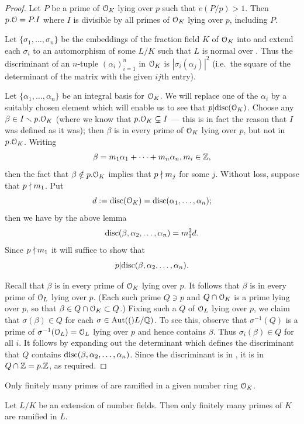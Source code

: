 \documentclass[10pt,a4paper]{amsart}
\begin{document}
\begin{proof}
Let $P$ be a prime of $\mathcal{O}_K$ lying over $p$ such that $e(P/p) > 1$. Then $p.\mathcal{O}
= P.I$ where $I$ is divisible by all primes of $\mathcal{O}_K$ lying over $p$, including
$P$.

Let $\{\sigma_1,\dots,\sigma_n\}$ be the embeddings of the fraction field $K$
of $\mathcal{O}_K$ into \C{} and extend each $\sigma_i$ to an automorphism of some $L/K$
such that $L$ is normal over \Q{}. Thus the discriminant of an $n$-tuple
$(\alpha_i)_{i=1}^n$ in $\mathcal{O}_K$ is $|\sigma_i(\alpha_j)|^2$ (i.e.~the square of
the determinant of the matrix with the given $ij$th entry).

Let $\{\alpha_1,\dots,\alpha_n\}$ be an integral basis for $\mathcal{O}_K$. We will
replace one of the $\alpha_i$ by a suitably chosen element which will enable us
to see that $p|\mathrm{disc}(\mathcal{O}_K)$. Choose any $\beta \in I\smallsetminus p.\mathcal{O}_K$
(where we know that $p.\mathcal{O}_K \subsetneq I$ --- this is in fact the reason that
$I$ was defined as it was); then $\beta$ is in every prime of $\mathcal{O}_K$ lying over
$p$, but not in $p.\mathcal{O}_K$. Writing \[\beta = m_1\alpha_1 + \cdots + m_n\alpha_n,
m_i\in \mathbb{Z},\] then the fact that $\beta\notin p.\mathcal{O}_K$ implies that $p\nmid m_j$
for some $j$. Without loss, suppose that $p\nmid m_1$. Put \[d := \mathrm{disc}(\mathcal{O}_K) =
\mathrm{disc}(\alpha_1,\dots,\alpha_n);\] then we have by the above lemma
\[\mathrm{disc}(\beta,\alpha_2,\dots,\alpha_n) = m_1^2 d.\] Since $p\nmid m_1$ it will
suffice to show that \[p | \mathrm{disc}(\beta,\alpha_2,\dots,\alpha_n).\]

Recall that $\beta$ is in every prime of $\mathcal{O}_K$ lying over $p$. It follows that
$\beta$ is in every prime of $\mathcal{O}_L$ lying over $p$. (Each such prime $Q\ni p$
and $Q\cap \mathcal{O}_K$ is a prime lying over $p$, so that $\beta\in Q\cap\mathcal{O}_K \subset
Q$.) Fixing such a $Q$ of $\mathcal{O}_L$ lying over $p$, we claim that
$\sigma(\beta)\in Q$ for each $\sigma \in \mathrm{Aut}(()L/\mathbb{Q})$. To see this, observe
that $\sigma^{-1}(Q)$ is a prime of $\sigma^{-1}(\mathcal{O}_L)=\mathcal{O}_L$ lying over $p$ and
hence contains $\beta$. Thus $\sigma_i(\beta)\in Q$ for all $i$. It follows by
expanding out the determinant which defines the discriminant that $Q$ contains
$\mathrm{disc}(\beta,\alpha_2,\dots,\alpha_n)$. Since the discriminant is in \Z{}, it
is in $Q\cap \mathbb{Z} = p.\mathbb{Z}$, as required.
\end{proof}

\begin{cor}
Only finitely many primes of \Z{} are ramified in a given number ring $\mathcal{O}_K$.
\end{cor}

\begin{cor}
Let $L/K$ be an extension of number fields. Then only finitely many primes of
$K$ are ramified in $L$.
\end{cor}
\end{document}
